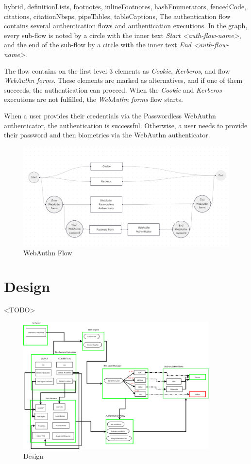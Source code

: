\documentclass[
  digital,     %
  oneside,     %
  nosansbold,  %
  nocolorbold, %
  lof,         %
  lot,         %
]{fithesis4}
\begin{document}
\begin{markdown*}{%
  hybrid,
  definitionLists,
  footnotes,
  inlineFootnotes,
  hashEnumerators,
  fencedCode,
  citations,
  citationNbsps,
  pipeTables,
  tableCaptions,
}
The authentication flow contains several authentication flows and authentication executions.
In the graph, every sub-flow is noted by a circle with the inner text \textit{Start <auth-flow-name>}, and the end of the sub-flow by a circle with the inner text \textit{End <auth-flow-name>}.

The flow contains on the first level 3 elements as \textit{Cookie}, \textit{Kerberos}, and flow \textit{WebAuthn forms}.
These elements are marked as alternatives, and if one of them succeeds, the authentication can proceed.
When the \textit{Cookie} and \textit{Kerberos} executions are not fulfilled, the \textit{WebAuthn forms} flow starts.

When a user provides their credentials via the Passwordless WebAuthn authenticator, the authentication is successful.
Otherwise, a user needs to provide their password and then biometrics via the WebAuthn authenticator.

\begin{figure}[htbp]
  \centering
  \includegraphics[width=1.04\textwidth]{img/flow.png}
  \caption{WebAuthn Flow}
  \label{fig:basic-auth-flow}
\end{figure}

\chapter{Design}
\shorthandoff{-}

<TODO>
\begin{figure}
    \centering
    \includegraphics[width=0.9\textwidth]{img/Design1.0.png}
    \caption{Design}
    \label{fig:design}
\end{figure}


\end{markdown*}
\end{document}
